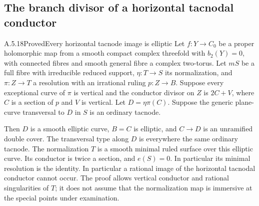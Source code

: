 \subsection{The branch divisor of a horizontal tacnodal conductor}

\begin{statement}{A.5.18}{Proved}{Every horizontal tacnode image is elliptic}
Let $f:Y\to C_0$ be a proper holomorphic map from a smooth
compact complex threefold with $b_2(Y)=0$, with connected
fibres and smooth general fibre a complex two-torus.
Let $mS$ be a full fibre with irreducible reduced support,
$\eta:T\to S$ its normalization, and $\pi:Z\to T$ a
resolution with an irrational ruling $p:Z\to B$.
Suppose every exceptional curve of $\pi$ is vertical and
the conductor divisor on $Z$ is $2C+V$, where $C$ is a
section of $p$ and $V$ is vertical. Let $D=\eta\pi(C)$.
Suppose the generic plane-curve transversal to $D$ in $S$ is an
ordinary tacnode.

Then $D$ is a smooth elliptic curve, $B=C$ is elliptic,
and $C\to D$ is an unramified double cover. The transversal
type along $D$ is everywhere the same ordinary tacnode.
The normalization $T$ is a smooth minimal ruled surface
over this elliptic curve. Its conductor is twice a
section, and $e(S)=0$. In particular its minimal
resolution is the identity.
In particular a rational image of
the horizontal tacnodal conductor cannot occur. The proof
allows vertical conductor and rational singularities of
$T$; it does not assume that the normalization map is
immersive at the special points under examination.
\end{statement}
